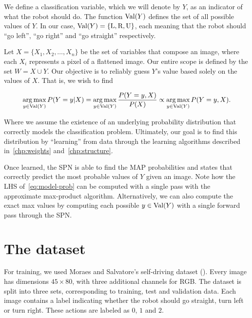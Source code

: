 We define a classification variable, which we will denote by $Y$, as an indicator of what the robot
should do. The function $\operatorname*{\text{Val}}(Y)$ defines the set of all possible values of $Y$. In our case,
$\operatorname*{\text{Val}}(Y)=\{\text{L},\text{R}, \text{U}\}$, each meaning that the robot should ``go left'', ``go right'' and
``go straight'' respectively.

Let $X=\{X_1,X_2,\ldots,X_n\}$ be the set of variables that compose an image, where each $X_i$
represents a pixel of a flattened image. Our entire scope is defined by the set $W=X\cup Y$. Our
objective is to reliably guess $Y$'s value based solely on the values of $X$. That is, we wish to
find

\begin{equation}\label{eq:model-prob}
  \operatorname*{arg\,max}_{y\in\operatorname*{\text{Val}}(Y)} P(Y=y|X) = \operatorname*{arg\,max}_{y\in\operatorname*{\text{Val}}(Y)} \frac{P(Y=y,X)}{P(X)}\propto
  \operatorname*{arg\,max}_{y\in\operatorname*{\text{Val}}(Y)} P(Y=y,X).
\end{equation}

Where we assume the existence of an underlying probability distribution that correctly models the
classification problem. Ultimately, our goal is to find this distribution by ``learning'' from data
through the learning algorithms described in~\autoref{chp:weights} and~\autoref{chp:structure}.

Once learned, the SPN is able to find the MAP probabilities and states that correctly predict the
most probable values of $Y$ given an image. Note how the LHS of~\autoref{eq:model-prob} can be
computed with a single pass with the approximate max-product algorithm. Alternatively, we can also
compute the exact max values by computing each possible $y\in\operatorname*{\text{Val}}(Y)$ with a single forward pass
through the SPN.

\section{The dataset}

For training, we used Moraes and Salvatore's self-driving dataset (\cite{self-driving}). Every
image has dimensions $45\times 80$, with three additional channels for RGB. The dataset is split
into three sets, corresponding to training, test and validation data. Each image contains a label
indicating whether the robot should go straight, turn left or turn right. These actions are labeled
as $0$, $1$ and $2$.

